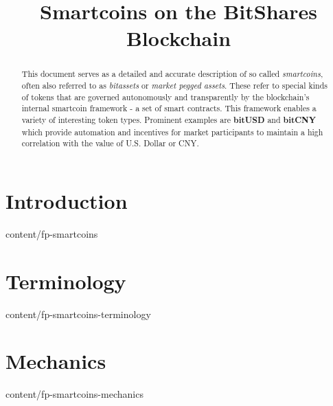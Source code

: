 \documentclass{btswhitepaper}
\title{Smartcoins on the BitShares Blockchain}
\begin{document}
\sloppy
\maketitle

\begin{abstract}%

 This document serves as a detailed and accurate description of so called
 \emph{smartcoins}, often also referred to as \emph{bitassets} or \emph{market
 pegged assets}. These refer to special kinds of tokens that are governed
 autonomously and transparently by the blockchain's internal smartcoin
 framework - a set of smart contracts. This framework enables a variety of
 interesting token types. Prominent examples are \textbf{bitUSD} and
 \textbf{bitCNY} which provide automation and incentives for market
 participants to maintain a high correlation with the value of U.S. Dollar or
 CNY.

\end{abstract}

\section       { Introduction                                     }  { content/fp-smartcoins             }
\section       { Terminology                                      }  { content/fp-smartcoins-terminology }


\section       { Mechanics                                        }  { content/fp-smartcoins-mechanics   }
\end{document}
